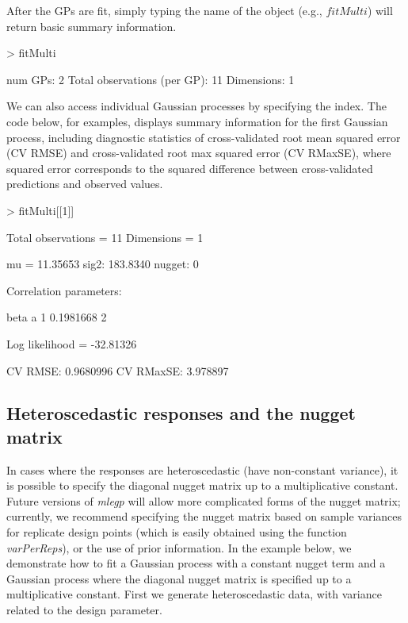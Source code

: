 After the GPs are fit, simply typing the name of the object (e.g., $fitMulti$) will return basic summary information. 
\begin{Schunk}
\begin{Sinput}
> fitMulti
\end{Sinput}
\begin{Soutput}
num GPs: 2
Total observations (per GP): 11
Dimensions: 1
\end{Soutput}
\end{Schunk}
We can also access individual Gaussian processes by specifying the index. The code below, for examples, displays summary information for the first Gaussian process, including diagnostic statistics of cross-validated root mean squared error (CV RMSE) and cross-validated root max squared error (CV RMaxSE), where squared error corresponds to the squared difference between cross-validated predictions and observed values.
\begin{Schunk}
\begin{Sinput}
> fitMulti[[1]]
\end{Sinput}
\begin{Soutput}
Total observations = 11
Dimensions = 1

mu = 11.35653
sig2:	183.8340
nugget:	0

Correlation parameters:

       beta a
1 0.1981668 2

Log likelihood = -32.81326

CV RMSE: 0.9680996
CV RMaxSE: 3.978897
\end{Soutput}
\end{Schunk}
\subsection{Heteroscedastic responses and the nugget matrix}
In cases where the responses are heteroscedastic (have non-constant variance), it is possible to specify the diagonal nugget matrix up to a multiplicative constant. Future versions of {\it mlegp} will allow more complicated forms of the nugget matrix; currently, we recommend specifying the nugget matrix based on sample variances for replicate design points (which is easily obtained using the function {\it varPerReps}), or the use of prior information. In the example below, we demonstrate how to fit a Gaussian process with a constant nugget term and a Gaussian process where the diagonal nugget matrix is specified up to a multiplicative constant. First we generate heteroscedastic data, with variance related to the design parameter.   

